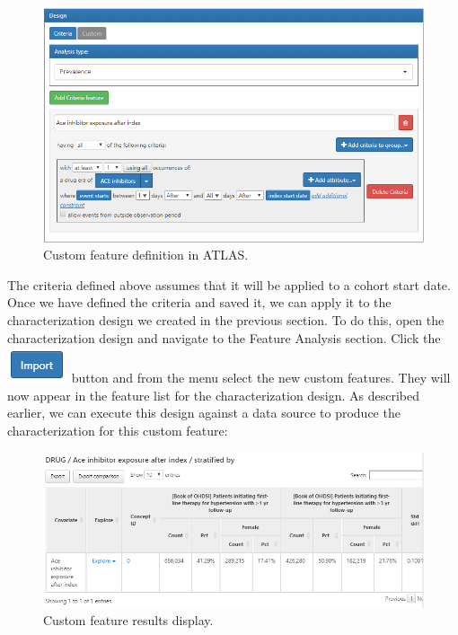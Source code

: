 \documentclass[11pt]{book}
\theoremstyle{definition}
\theoremstyle{definition}
\theoremstyle{definition}
\theoremstyle{remark}
\begin{document}
\begin{figure}

{\centering \includegraphics[width=1\linewidth]{images/Characterization/atlasCharacterizationCustomFeature} 

}

\caption{Custom feature definition in ATLAS.}\label{fig:atlasCharacterizationCustomFeature}
\end{figure}

The criteria defined above assumes that it will be applied to a cohort start date. Once we have defined the criteria and saved it, we can apply it to the characterization design we created in the previous section. To do this, open the characterization design and navigate to the Feature Analysis section. Click the \includegraphics{images/Characterization/atlasImportButton.png} button and from the menu select the new custom features. They will now appear in the feature list for the characterization design. As described earlier, we can execute this design against a data source to produce the characterization for this custom feature:

\begin{figure}

{\centering \includegraphics[width=1\linewidth]{images/Characterization/atlasCharacterizationCustomFeatureResults} 

}

\caption{Custom feature results display.}\label{fig:atlasCharacterizationCustomFeatureResults}
\end{figure}
\end{document}
